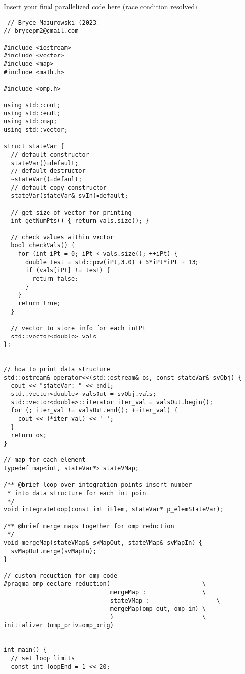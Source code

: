 \documentclass[11pt]{article}
\begin{document}
Insert your final parallelized code here (race condition resolved)
\begin{verbatim}
 // Bryce Mazurowski (2023)
// brycepm2@gmail.com

#include <iostream>
#include <vector>
#include <map>
#include <math.h>

#include <omp.h>

using std::cout;
using std::endl;
using std::map;
using std::vector;

struct stateVar {
  // default constructor
  stateVar()=default;
  // default destructor
  ~stateVar()=default;
  // default copy constructor
  stateVar(stateVar& svIn)=default;

  // get size of vector for printing
  int getNumPts() { return vals.size(); }

  // check values within vector
  bool checkVals() {
    for (int iPt = 0; iPt < vals.size(); ++iPt) {
      double test = std::pow(iPt,3.0) + 5*iPt*iPt + 13;
      if (vals[iPt] != test) {
        return false;
      }
    }
    return true;
  }

  // vector to store info for each intPt
  std::vector<double> vals;
};


// how to print data structure
std::ostream& operator<<(std::ostream& os, const stateVar& svObj) {
  cout << "stateVar: " << endl;
  std::vector<double> valsOut = svObj.vals;
  std::vector<double>::iterator iter_val = valsOut.begin();
  for (; iter_val != valsOut.end(); ++iter_val) {
    cout << (*iter_val) << ' ';
  }
  return os;
}

// map for each element
typedef map<int, stateVar*> stateVMap;

/** @brief loop over integration points insert number
 * into data structure for each int point
 */
void integrateLoop(const int iElem, stateVar* p_elemStateVar);

/** @brief merge maps together for omp reduction
 */
void mergeMap(stateVMap& svMapOut, stateVMap& svMapIn) {
  svMapOut.merge(svMapIn);
}

// custom reduction for omp code
#pragma omp declare reduction(                          \
                              mergeMap :                \
                              stateVMap :                   \
                              mergeMap(omp_out, omp_in) \
                              )                         \
initializer (omp_priv=omp_orig)


int main() {
  // set loop limits
  const int loopEnd = 1 << 20;


\end{verbatim}
\end{document}
